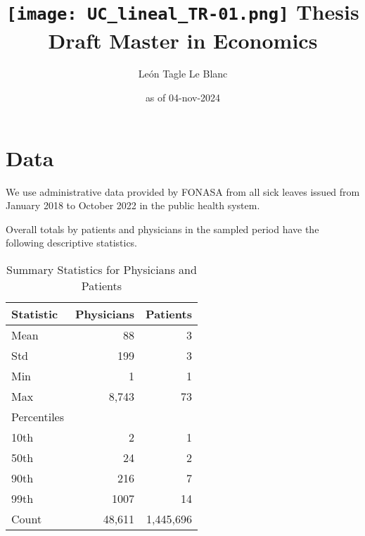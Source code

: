 \documentclass[11pt]{article}
\title{\texttt{[image: UC\_lineal\_TR-01.png]} \linebreak \linebreak 
Thesis Draft \linebreak Master in Economics}
\author{León Tagle Le Blanc}
\date{as of 04-nov-2024}
\begin{document}
\begin{titlepage}
\maketitle
\thispagestyle{empty}

\newpage
\tableofcontents
\setcounter{page}{0}
\thispagestyle{empty}
\end{titlepage}










\section{Data}

We use administrative data provided by FONASA from all sick leaves issued from January 2018 to October 2022 in the public health system.

Overall totals by patients and physicians in the sampled period have the following descriptive statistics.

\begin{table}[h]
    \centering
    \begin{tabular}{lrr}
    \toprule
    Statistic & Physicians & Patients \\
    \midrule
    Mean      & 88     & 3       \\
    Std       & 199     & 3       \\
    Min       & 1      & 1      \\
    Max       & 8,743    & 73     \\
    Percentiles & & \\
    \hspace{1em}10th     & 2       & 1       \\
    \hspace{1em}50th  & 24    & 2       \\
    \hspace{1em}90th    & 216     & 7       \\
    \hspace{1em}99th     & 1007    & 14      \\
    Count     & 48,611   & 1,445,696 \\
    \bottomrule
    \end{tabular}
    \caption{Summary Statistics for Physicians and Patients}
\end{table}
\end{document}
